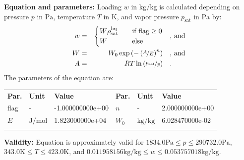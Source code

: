 \textbf{Equation and parameters:}
\newline
%
Loading $w$ in $\si{\kilogram\per\kilogram}$ is calculated depending on pressure $p$ in $\si{\pascal}$, temperature $T$ in $\si{\kelvin}$, and vapor pressure $p_\mathrm{sat}$ in $\si{\pascal}$ by:
%
\begin{equation*}
\begin{split}
w &=& \begin{cases} W \rho_\mathrm{sat}^{\mathrm{liq}} & \quad \text{if flag} \geq 0 \\ W & \quad \text{else} \end{cases} & \quad\text{, and} \\
W &=& W_0 \exp \left( - \left( \nicefrac{A}{E} \right) ^{n} \right) & \quad\text{, and} \\
A &=& R T \ln \left( \nicefrac{p_\mathrm{sat}}{p} \right) & \quad\text{.} \\
\end{split}
\end{equation*}
%
The parameters of the equation are:
%
\begin{longtable}[l]{lll|lll}
\toprule
\addlinespace
\textbf{Par.} & \textbf{Unit} & \textbf{Value} &	\textbf{Par.} & \textbf{Unit} & \textbf{Value} \\
\addlinespace
\midrule
\endhead

\bottomrule
\endfoot
\bottomrule
\endlastfoot
\addlinespace

flag & - & -1.000000000e+00 & $n$ & - & 2.000000000e+00 \\
$E$ & $\si{\joule\per\mole}$ & 1.823000000e+04 & $W_0$ & $\si{\kilogram\per\kilogram}$ & 6.028470000e-02 \\

\addlinespace\end{longtable}

\textbf{Validity:}
\newline
Equation is approximately valid for $1834.0 \si{\pascal} \leq p \leq 290732.0 \si{\pascal}$,  $343.0 \si{\kelvin} \leq T \leq 423.0 \si{\kelvin}$, and $0.011958156 \si{\kilogram\per\kilogram} \leq w \leq 0.053757018 \si{\kilogram\per\kilogram}$.
\newline

